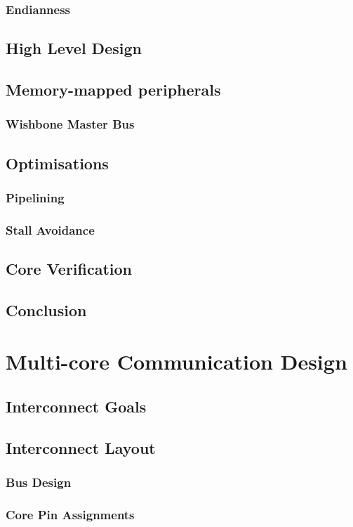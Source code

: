\documentclass[11pt,a4paper,twoside]{report}
\begin{document}
        \subsection{Endianness}
    \section{High Level Design}
    \section{Memory-mapped peripherals}
        \subsection{Wishbone Master Bus}
    \section{Optimisations}
        \subsection{Pipelining}
        \subsection{Stall Avoidance}
    \section{Core Verification}
    \section{Conclusion}
        
\chapter{Multi-core Communication Design}
    \section{Interconnect Goals}
    \section{Interconnect Layout}
        \subsection{Bus Design}
        \subsection{Core Pin Assignments}
\end{document}

